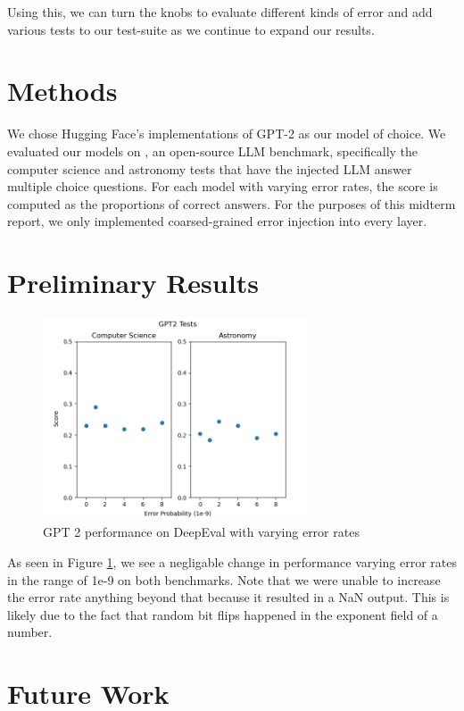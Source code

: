 \documentclass[a4paper]{article}
\begin{document}
Using this, we can turn the knobs to evaluate different kinds of error and add various tests to our test-suite as we continue to expand our results.

\section{Methods}
We chose Hugging Face's implementations of GPT-2 \cite{gpt2} as our model of choice. We evaluated our models on \cite{DeepEval}, an open-source LLM benchmark, specifically the computer science and astronomy tests that have the injected LLM answer multiple choice questions. For each model with varying error rates, the score is computed as the proportions of correct answers. For the purposes of this midterm report, we only implemented coarsed-grained error injection into every layer.

\section{Preliminary Results}
\begin{figure}[ht]
	\begin{center}
		\includegraphics[height=6cm]{gpt2.png}
		\caption{GPT 2 performance on DeepEval with varying error rates}
		\label{gpt2-res}
	\end{center}
\end{figure}

As seen in Figure \ref{gpt2-res}, we see a negligable change in performance varying error rates in the range of 1e-9 on both benchmarks. Note that we were unable to increase the error rate anything beyond that because it resulted in a NaN output. This is likely due to the fact that random bit flips happened in the exponent field of a number.

\section{Future Work}
\end{document}
